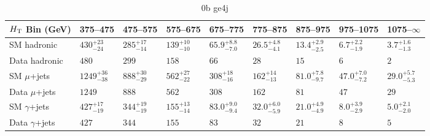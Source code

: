 \documentclass[8pt]{article}
\def\scalht{\mbox{$H_{\rm{T}}$}\xspace}
\newcommand\T{\rule{0pt}{2.6ex}}
\newcommand\B{\rule[-1.2ex]{0pt}{0pt}}
\begin{document}
\begin{table}[ht!]
\caption{0b ge4j}
\label{tab:ensemble-0b ge4j}
\centering
\begin{tabular}{ lllllllll }

\hline
\scalht Bin (GeV)       & 375--475                       & 475--575                       & 575--675                       & 675--775                       & 775--875                       & 875--975                       & 975--1075                      & 1075--$\infty$                 \\ [1.000000ex]
\hline
SM hadronic\T           & $430^{+23}_{-24}$              & $285^{+17}_{-14}$              & $139^{+10}_{-10}$              & $65.9^{+8.8}_{-7.0}$           & $26.5^{+4.8}_{-4.1}$           & $13.4^{+2.9}_{-2.5}$           & $6.7^{+2.2}_{-1.9}$            & $3.7^{+1.6}_{-1.3}$            \\ 
Data hadronic\B         & $480$                          & $299$                          & $158$                          & $66$                           & $28$                           & $15$                           & $6$                            & $2$                            \\ 
\hline
SM $\mu$+jets\T         & $1249^{+36}_{-38}$             & $888^{+30}_{-29}$              & $562^{+27}_{-22}$              & $308^{+18}_{-16}$              & $162^{+14}_{-13}$              & $81.0^{+7.8}_{-9.7}$           & $47.0^{+7.0}_{-7.2}$           & $29.0^{+5.7}_{-5.3}$           \\ 
Data $\mu$+jets\B       & $1249$                         & $888$                          & $562$                          & $308$                          & $162$                          & $81$                           & $47$                           & $29$                           \\ 
\hline
SM $\gamma$+jets\T      & $427^{+17}_{-19}$              & $344^{+19}_{-19}$              & $155^{+13}_{-14}$              & $83.0^{+9.0}_{-9.4}$           & $32.0^{+6.0}_{-5.9}$           & $21.0^{+4.9}_{-4.9}$           & $8.0^{+3.9}_{-2.9}$            & $5.0^{+2.1}_{-2.0}$            \\ 
Data $\gamma$+jets\B    & $427$                          & $344$                          & $155$                          & $83$                           & $32$                           & $21$                           & $8$                            & $5$                            \\ 
\hline

\end{tabular}
\end{table}
\end{document}

